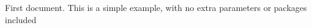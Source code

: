 \documentclass{article}
\begin{document}
First document. This is a simple example, with no extra parameters or packages included
\end{document}
